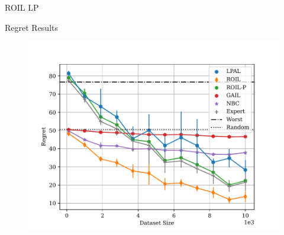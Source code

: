 \documentclass[final,a0paper]{beamer}
\begin{document}
\begin{frame}{}
\begin{columns}[t]
\begin{column}{0.3\linewidth}
\begin{block}{ROIL LP}
    \end{block}
    \begin{block}{Regret Results}
        \begin{center}
            \begin{figure}
                \includegraphics[scale=1.2]{../../pres_roil/plots/regrets/40x40_gridworld_on_policy_regret_regrets.pdf}
            \end{figure}
        \end{center}
    \end{block}
  \end{column}


\end{columns}
\end{frame}
\end{document}
